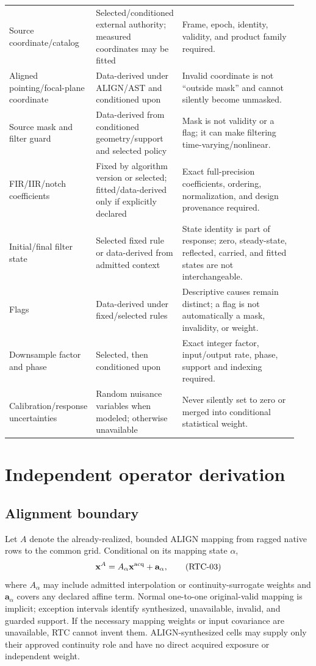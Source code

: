 \documentclass[11pt]{article}
\begin{document}
\begin{longtable}{@{}p{0.24\linewidth}p{0.22\linewidth}p{0.48\linewidth}@{}}
Source coordinate/catalog & Selected/conditioned external authority; measured coordinates may be fitted & Frame, epoch, identity, validity, and product family required. \\
Aligned pointing/focal-plane coordinate & Data-derived under ALIGN/AST and conditioned upon & Invalid coordinate is not ``outside mask'' and cannot silently become unmasked. \\
Source mask and filter guard & Data-derived from conditioned geometry/support and selected policy & Mask is not validity or a flag; it can make filtering time-varying/nonlinear. \\
FIR/IIR/notch coefficients & Fixed by algorithm version or selected; fitted/data-derived only if explicitly declared & Exact full-precision coefficients, ordering, normalization, and design provenance required. \\
Initial/final filter state & Selected fixed rule or data-derived from admitted context & State identity is part of response; zero, steady-state, reflected, carried, and fitted states are not interchangeable. \\
Flags & Data-derived under fixed/selected rules & Descriptive causes remain distinct; a flag is not automatically a mask, invalidity, or weight. \\
Downsample factor and phase & Selected, then conditioned upon & Exact integer factor, input/output rate, phase, support and indexing required. \\
Calibration/response uncertainties & Random nuisance variables when modeled; otherwise unavailable & Never silently set to zero or merged into conditional statistical weight. \\
\bottomrule
\end{longtable}

\section{Independent operator derivation}

\subsection{Alignment boundary}

Let $A$ denote the already-realized, bounded ALIGN mapping from ragged native
rows to the common grid.  Conditional on its mapping state $\alpha$,
\begin{equation}
  \mathbf x^A=A_{\alpha}\mathbf x^{\rm acq}+\mathbf a_{\alpha},
  \tag{RTC-03}\label{eq:align}
\end{equation}
where $A_\alpha$ may include admitted interpolation or continuity-surrogate
weights and $\mathbf a_\alpha$ covers any declared affine term.  Normal
one-to-one original-valid mapping is implicit; exception intervals identify
synthesized, unavailable, invalid, and guarded support.  If the necessary
mapping weights or input covariance are unavailable, RTC cannot invent them.
ALIGN-synthesized cells may supply only their approved continuity role and
have no direct acquired exposure or independent weight.
\end{document}
